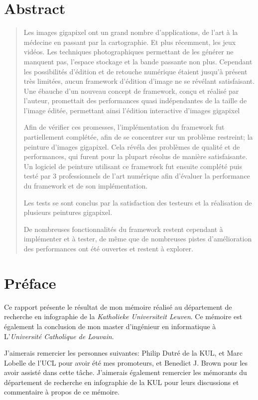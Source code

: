 
\chapter*{Abstract}
	\begin{abstract}
	Les images gigapixel ont un grand nombre d'applications, de l'art à la médecine en passant par la cartographie. Et plus 
	récemment, les jeux vidéos. Les techniques photographiques permettant de les générer ne manquent pas, l'espace stockage 
	et la bande passante non plus. Cependant les possibilités d'édition et de retouche numérique étaient jusqu'à présent 
	très limitées, aucun framework d'édition d'image ne se révélant satisfaisant. Une ébauche d'un nouveau concept de framework,
	conçu et réalisé par l'auteur, promettait des performances quasi indépendantes de la taille de l'image éditée, permettant ainsi 
	l'édition interactive d'images gigapixel

	Afin de vérifier ces promesses, l'implémentation du framework fut partiellement complétée, afin de se concentrer sur un problème restreint;
	la peinture d'images gigapixel. Cela révéla des problèmes de qualité et de performances,
	qui furent pour la plupart résolus de manière satisfaisante. Un logiciel de peinture utilisant ce framework fut ensuite 
	complété puis testé par 3 professionnels de l'art numérique afin d'évaluer la performance du framework et de son implémentation. 

	Les tests se sont conclus par la satisfaction des testeurs et la réalisation de plusieurs peintures gigapixel. 
	
	De nombreuses fonctionnalités du framework restent cependant à implé\-menter et à tester, de même que de nombreuses pistes
	d'amélioration des performances ont été ouvertes et restent à explorer.
	\end{abstract}
	

\chapter*{Préface}
	Ce rapport présente le résultat de mon mémoire réalisé au département de recherche en infographie de la \emph{Katholieke Universiteit Leuven}.
	Ce mémoire est également la conclusion de mon master d'ingénieur en informatique à L'\emph{Université Catholique de Louvain}.

	J'aimerais remercier les personnes suivantes: Philip Dutré de la KUL, et Marc Lobelle de l'UCL pour avoir été mes promoteurs,
	et Benedict J. Brown pour les avoir assisté dans cette tâche. J'aimerais également remercier les mémorants du département de recherche en infographie
	de la KUL pour leurs discussions et commentaire à propos de ce mémoire. 

